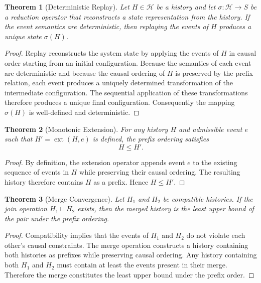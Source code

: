 \documentclass[12pt]{article}
\newtheorem{theorem}{Theorem}
\begin{document}
\begin{theorem}[Deterministic Replay]
Let $H \in \mathcal{H}$ be a history and let
$\sigma : \mathcal{H} \rightarrow S$ be a reduction
operator that reconstructs a state representation
from the history. If the event semantics are
deterministic, then replaying the events of $H$
produces a unique state $\sigma(H)$.
\end{theorem}

\begin{proof}
Replay reconstructs the system state by applying
the events of $H$ in causal order starting from an
initial configuration. Because the semantics of
each event are deterministic and because the causal
ordering of $H$ is preserved by the prefix relation,
each event produces a uniquely determined
transformation of the intermediate configuration.
The sequential application of these transformations
therefore produces a unique final configuration.
Consequently the mapping $\sigma(H)$ is well-defined
and deterministic.
\end{proof}

\begin{theorem}[Monotonic Extension]
For any history $H$ and admissible event $e$ such that
$H' = \operatorname{ext}(H,e)$ is defined, the prefix
ordering satisfies
\[
H \leq H'.
\]
\end{theorem}

\begin{proof}
By definition, the extension operator appends event $e$
to the existing sequence of events in $H$ while preserving
their causal ordering. The resulting history therefore
contains $H$ as a prefix. Hence $H \leq H'$.
\end{proof}

\begin{theorem}[Merge Convergence]
Let $H_1$ and $H_2$ be compatible histories.
If the join operation $H_1 \sqcup H_2$ exists,
then the merged history is the least upper bound
of the pair under the prefix ordering.
\end{theorem}

\begin{proof}
Compatibility implies that the events of $H_1$ and
$H_2$ do not violate each other's causal constraints.
The merge operation constructs a history containing
both histories as prefixes while preserving causal
ordering. Any history containing both $H_1$ and $H_2$
must contain at least the events present in their
merge. Therefore the merge constitutes the least
upper bound under the prefix order.
\end{proof}
\end{document}
